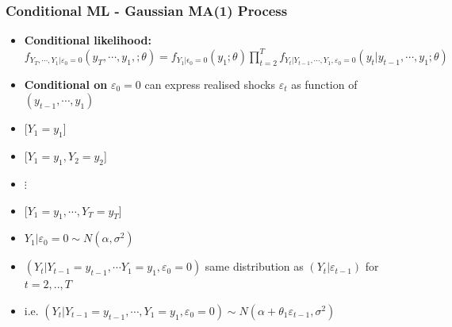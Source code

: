 \documentclass{beamer}
\begin{document}
						\begin{frame}
						\frametitle{Conditional ML - Gaussian MA(1) Process}
						\begin{itemize}
	
				\item[] \textbf{Conditional likelihood:}				 $f_{Y_T,\cdots, Y_1|\varepsilon_0=0}(y_T,\cdots,y_1,; \theta)= f_{Y_1|\epsilon_0=0}(y_1;\theta)	 \displaystyle \prod_{t=2}^{T} f_{Y_t|Y_{t-1},\cdots ,Y_1,\varepsilon_0=0}(y_t| y_{t-1}, \cdots,y_1; \theta)$
							\pause
				\pause\vspace{15pt}
				
							\item[] \textbf{Conditional on} $\varepsilon_0=0$ can express realised shocks $\varepsilon_t$ as function of $(y_{t-1}, \cdots, y_1)$ 
							
								
							\pause\vspace{15pt}
					\item[]            \hspace{39pt}      [$Y_1=y_1$]
						\pause\vspace{9pt}
					\item[]            \hspace{39pt}         [$Y_1=y_1, Y_2=y_2$]	\pause\vspace{9pt}
					\item[]         \hspace{39pt}            $\vdots$	\pause\vspace{9pt}
					\item[]  \hspace{39pt}    [$Y_1=y_1, \cdots, Y_T=y_T$]
					
					\pause
					\vspace{15pt}
					\item[]  $Y_1|\varepsilon_0=0\sim  N(\alpha,\sigma^2)$
						\pause\vspace{12pt}
			\item[] $(Y_t|Y_{t-1}=y_{t-1},\cdots Y_1=y_1,\varepsilon_0=0)$ same distribution as $(Y_{t}|\varepsilon_{t-1})$ \hspace{7pt} for  $t=2,..,T$
				\pause\vspace{8pt}
\item[] 	i.e. 	       \hspace{32pt}  $(Y_t|Y_{t-1}=y_{t-1},\cdots, Y_1=y_1,\varepsilon_0=0)	\sim N(\alpha+\theta_1\varepsilon_{t-1}, \sigma^2)$ 
					
				\end{itemize}
		\end{frame}
	
\end{document}

